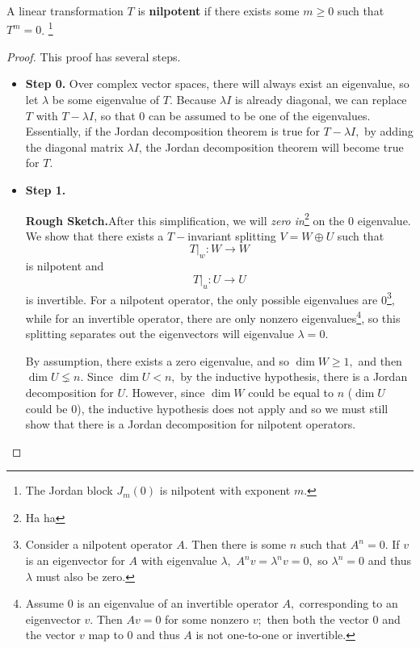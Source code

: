 \begin{definition}
A linear transformation $T$ is \textbf{nilpotent} if there exists some $m \geq 0$ such that $T^m = 0$. \footnote{The Jordan block $J_m(0)$ is nilpotent with exponent $m.$} %
\end{definition}

\begin{proof}
This proof has several steps.

\begin{itemize}
    \item \textbf{Step 0.} Over complex vector spaces, there will always exist an eigenvalue, so let $\lambda$ be some eigenvalue of $T.$ Because $\lambda I$ is already diagonal, we can replace $T$ with $T - \lambda I$, so that 0 can be assumed to be one of the eigenvalues. Essentially, if the Jordan decomposition theorem is true for $T - \lambda I,$ by adding the diagonal matrix $\lambda I$, the Jordan decomposition theorem will become true for $T.$
    
    \item \textbf{Step 1.} 
    
    \textbf{Rough Sketch.}After this simplification, we will \emph{zero in}\footnote{Ha ha} on the 0 eigenvalue. We show that there exists a $T-$invariant splitting $V = W \oplus U$ such that \[T \big|_w: W \rightarrow W\] is nilpotent and 
    \[T \big|_u: U \rightarrow U\] is invertible. For a nilpotent operator, the only possible eigenvalues are 0\footnote{Consider a nilpotent operator $A.$ Then there is some $n$ such that $A^n = 0.$ If $v$ is an eigenvector for $A$ with eigenvalue $\lambda,$ $A^n v = \lambda^n v = 0,$ so $\lambda^n = 0$ and thus $\lambda$ must also be zero.}, while for an invertible operator, there are only nonzero eigenvalues\footnote{Assume 0 is an eigenvalue of an invertible operator $A,$ corresponding to an eigenvector $v.$ Then $Av = 0$ for some nonzero $v;$ then both the vector 0 and the vector $v$ map to 0 and thus $A$ is not one-to-one or invertible.}, so this splitting separates out the eigenvectors will eigenvalue $\lambda = 0.$
    
    By assumption, there exists a zero eigenvalue, and so $\dim W \geq 1,$ and then $\dim U \lneq n.$ Since $\dim U < n,$ by the inductive hypothesis, there is a Jordan decomposition for $U.$ However, since $\dim W$ could be equal to $n$ ($\dim U$ could be 0), the inductive hypothesis does not apply and so we must still show that there is a Jordan decomposition for nilpotent operators.
    

\end{itemize}
\end{proof}
